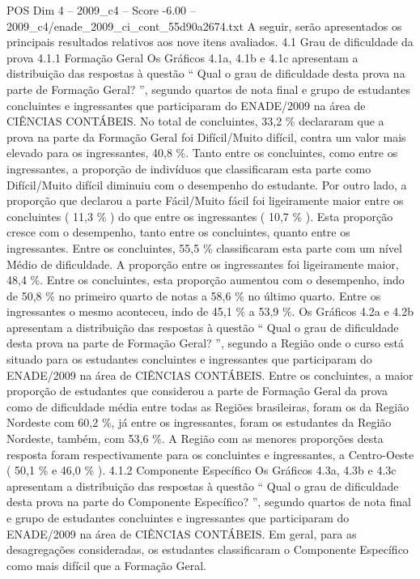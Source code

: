\begin{textsample}{POS Dim 4 – 2009\_c4 – Score -6.00 – 2009\_c4/enade\_2009\_ci\_cont\_55d90a2674.txt}
A seguir, serão apresentados os principais resultados relativos aos nove itens avaliados. 4.1 Grau de dificuldade da prova 4.1.1 Formação Geral Os Gráficos 4.1a, 4.1b e 4.1c apresentam a distribuição das respostas à questão “ Qual o grau de dificuldade desta prova na parte de Formação Geral? ”, segundo quartos de nota final e grupo de estudantes concluintes e ingressantes que participaram do ENADE/2009 na área de CIÊNCIAS CONTÁBEIS.
No total de concluintes, 33,2 \% declararam que a prova na parte da Formação Geral foi Difícil/Muito difícil, contra um valor mais elevado para os ingressantes, 40,8 \%.
Tanto entre os concluintes, como entre os ingressantes, a proporção de indivíduos que classificaram esta parte como Difícil/Muito difícil diminuiu com o desempenho do estudante.
Por outro lado, a proporção que declarou a parte Fácil/Muito fácil foi ligeiramente maior entre os concluintes ( 11,3 \% ) do que entre os ingressantes ( 10,7 \% ).
Esta proporção cresce com o desempenho, tanto entre os concluintes, quanto entre os ingressantes.
Entre os concluintes, 55,5 \% classificaram esta parte com um nível Médio de dificuldade.
A proporção entre os ingressantes foi ligeiramente maior, 48,4 \%.
Entre os concluintes, esta proporção aumentou com o desempenho, indo de 50,8 \% no primeiro quarto de notas a 58,6 \% no último quarto.
Entre os ingressantes o mesmo aconteceu, indo de 45,1 \% a 53,9 \%.
Os Gráficos 4.2a e 4.2b apresentam a distribuição das respostas à questão “ Qual o grau de dificuldade desta prova na parte de Formação Geral? ”, segundo a Região onde o curso está situado para os estudantes concluintes e ingressantes que participaram do ENADE/2009 na área de CIÊNCIAS CONTÁBEIS.
Entre os concluintes, a maior proporção de estudantes que considerou a parte de Formação Geral da prova como de dificuldade média entre todas as Regiões brasileiras, foram os da Região Nordeste com 60,2 \%, já entre os ingressantes, foram os estudantes da Região Nordeste, também, com 53,6 \%.
A Região com as menores proporções desta resposta foram respectivamente para os concluintes e ingressantes, a Centro-Oeste ( 50,1 \% e 46,0 \% ). 4.1.2 Componente Específico Os Gráficos 4.3a, 4.3b e 4.3c apresentam a distribuição das respostas à questão “ Qual o grau de dificuldade desta prova na parte do Componente Específico? ”, segundo quartos de nota final e grupo de estudantes concluintes e ingressantes que participaram do ENADE/2009 na área de CIÊNCIAS CONTÁBEIS.
Em geral, para as desagregações consideradas, os estudantes classificaram o Componente Específico como mais difícil que a Formação Geral.

\end{textsample}
